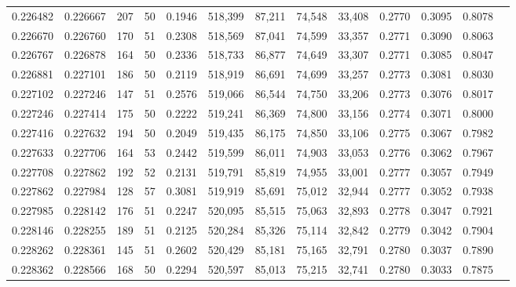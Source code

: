 \begin{tabular}{rrrrrrrrrrrrr}
0.226482 & 0.226667 &   207 &  50 &                                     0.1946 & 518,399 &  87,211 &  74,548 &  33,408 & 0.2770 & 0.3095 & 0.8078 \\
0.226670 & 0.226760 &   170 &  51 &                                     0.2308 & 518,569 &  87,041 &  74,599 &  33,357 & 0.2771 & 0.3090 & 0.8063 \\
0.226767 & 0.226878 &   164 &  50 &                                     0.2336 & 518,733 &  86,877 &  74,649 &  33,307 & 0.2771 & 0.3085 & 0.8047 \\
0.226881 & 0.227101 &   186 &  50 &                                     0.2119 & 518,919 &  86,691 &  74,699 &  33,257 & 0.2773 & 0.3081 & 0.8030 \\
0.227102 & 0.227246 &   147 &  51 &                                     0.2576 & 519,066 &  86,544 &  74,750 &  33,206 & 0.2773 & 0.3076 & 0.8017 \\
0.227246 & 0.227414 &   175 &  50 &                                     0.2222 & 519,241 &  86,369 &  74,800 &  33,156 & 0.2774 & 0.3071 & 0.8000 \\
0.227416 & 0.227632 &   194 &  50 &                                     0.2049 & 519,435 &  86,175 &  74,850 &  33,106 & 0.2775 & 0.3067 & 0.7982 \\
0.227633 & 0.227706 &   164 &  53 &                                     0.2442 & 519,599 &  86,011 &  74,903 &  33,053 & 0.2776 & 0.3062 & 0.7967 \\
0.227708 & 0.227862 &   192 &  52 &                                     0.2131 & 519,791 &  85,819 &  74,955 &  33,001 & 0.2777 & 0.3057 & 0.7949 \\
0.227862 & 0.227984 &   128 &  57 &                                     0.3081 & 519,919 &  85,691 &  75,012 &  32,944 & 0.2777 & 0.3052 & 0.7938 \\
0.227985 & 0.228142 &   176 &  51 &                                     0.2247 & 520,095 &  85,515 &  75,063 &  32,893 & 0.2778 & 0.3047 & 0.7921 \\
0.228146 & 0.228255 &   189 &  51 &                                     0.2125 & 520,284 &  85,326 &  75,114 &  32,842 & 0.2779 & 0.3042 & 0.7904 \\
0.228262 & 0.228361 &   145 &  51 &                                     0.2602 & 520,429 &  85,181 &  75,165 &  32,791 & 0.2780 & 0.3037 & 0.7890 \\
0.228362 & 0.228566 &   168 &  50 &                                     0.2294 & 520,597 &  85,013 &  75,215 &  32,741 & 0.2780 & 0.3033 & 0.7875 \\

\end{tabular}
